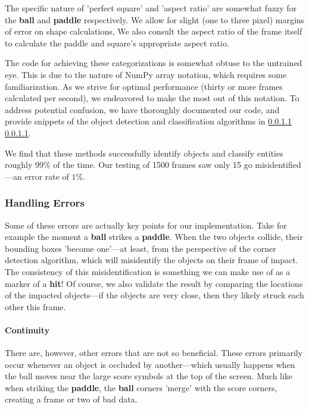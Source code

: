 \documentclass{report}
\newcommand{\state}[1]{\textbf{#1}}
\newcommand{\pad}{\textbf{paddle}\xspace}
\newcommand{\ball}{\textbf{ball}\xspace}
\begin{document}
The specific nature of 'perfect square' and 'aspect ratio' are somewhat fuzzy for the \ball and \pad respectively. We allow for slight (one to three pixel) margins of error on shape calculations, We also consult the aspect ratio of the frame itself to calculate the paddle and square's appropriate aspect ratio. 


The code for achieving these categorizations is somewhat obtuse to the untrained eye. This is due to the nature of NumPy array notation, which requires some familiarization. As we strive for optimal performance (thirty or more frames calculated per second), we endeavored to make the most out of this notation. To address potential confusion, we have thoroughly documented our code, and provide snippets of the object detection and classification algorithms in \ref{} \ref{}.

We find that these methods successfully identify objects and classify entities roughly 99\% of the time. Our testing of 1500 frames saw only 15 go misidentified---an error rate of $1\%$. 

\subsubsection{Handling Errors}

Some of these errors are actually key points for our implementation. Take for example the moment a \ball strikes a \pad. When the two objects collide, their bounding boxes 'become one'---at least, from the perspective of the corner detection algorithm, which will misidentify the objects on their frame of impact. The consistency of this misidentification is something we can make use of as a marker of a \state{hit}!  Of course, we also validate the result by comparing the locations of the impacted objects---if the objects are very close, then they likely struck each other this frame.

\paragraph{Continuity}

There are, however, other errors that are not so beneficial. These errors primarily occur whenever an object is occluded by another---which usually happens when the ball moves near the large score symbols at the top of the screen. Much like when striking the \pad, the \ball corners 'merge' with the score corners, creating a frame or two of bad data. 
\end{document}
